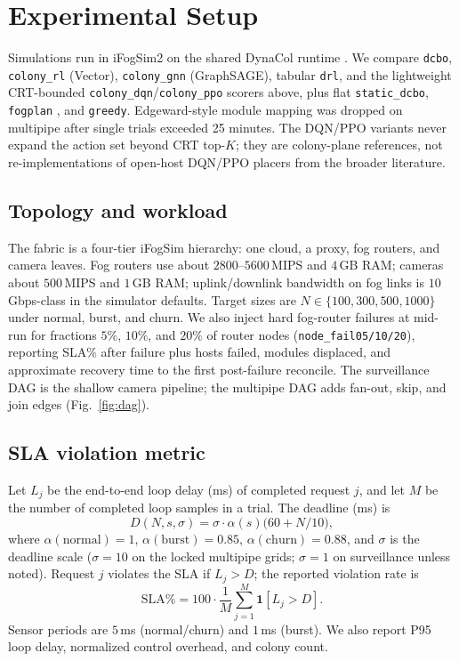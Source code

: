 \documentclass[pdflatex,sn-mathphys-num,iicol]{sn-jnl}
\begin{document}
\section{Experimental Setup}
\label{sec:setup}

Simulations run in iFogSim2 on the shared DynaCol runtime
\cite{gupta_ifogsim2017,mahmud_ifogsim2_jss2022}.
We compare \texttt{dcbo}, \texttt{colony\_rl} (Vector),
\texttt{colony\_gnn} (GraphSAGE), tabular \texttt{drl}, and the lightweight
CRT-bounded \texttt{colony\_dqn}/\texttt{colony\_ppo} scorers above, plus flat
\texttt{static\_dcbo}, \texttt{fogplan} \cite{yousefpour_fogplan_jiot2019}, and
\texttt{greedy}. Edgeward-style module mapping
\cite{taneja_im2017_edgeward} was dropped on multipipe after single trials
exceeded 25 minutes. The DQN/PPO variants never expand the action set beyond
CRT top-$K$; they are colony-plane references, not re-implementations of
open-host DQN/PPO placers from the broader literature.

\subsection{Topology and workload}
The fabric is a four-tier iFogSim hierarchy: one cloud, a proxy, fog routers, and
camera leaves. Fog routers use about $2800$--$5600$\,MIPS and $4$\,GB RAM; cameras
about $500$\,MIPS and $1$\,GB RAM; uplink/downlink bandwidth on fog links is
$10$\,Gbps-class in the simulator defaults. Target sizes are
$N\in\{100,300,500,1000\}$ under normal, burst, and churn. We also inject hard
fog-router failures at mid-run for fractions $5\%$, $10\%$, and $20\%$ of
router nodes (\texttt{node\_fail05/10/20}), reporting SLA\% after failure plus
hosts failed, modules displaced, and approximate recovery time to the first
post-failure reconcile. The surveillance DAG
is the shallow camera pipeline; the multipipe DAG adds fan-out, skip, and join
edges (Fig.~\ref{fig:dag}).

\subsection{SLA violation metric}
\label{sec:sla}
Let $L_j$ be the end-to-end loop delay (ms) of completed request $j$, and let
$M$ be the number of completed loop samples in a trial. The deadline (ms) is
\begin{equation}
D(N,s,\sigma)=\sigma\cdot\alpha(s)\bigl(60+N/10\bigr),
\label{eq:deadline}
\end{equation}
where $\alpha(\mathrm{normal}){=}1$, $\alpha(\mathrm{burst}){=}0.85$,
$\alpha(\mathrm{churn}){=}0.88$, and $\sigma$ is the deadline scale
($\sigma{=}10$ on the locked multipipe grids; $\sigma{=}1$ on surveillance unless
noted). Request $j$ violates the SLA if $L_j>D$; the reported violation rate is
\begin{equation}
\mathrm{SLA\%}=100\cdot\frac{1}{M}\sum_{j=1}^{M}\mathbf{1}[L_j>D].
\label{eq:slaviol}
\end{equation}
Sensor periods are $5$\,ms (normal/churn) and $1$\,ms (burst). We also report
P95 loop delay, normalized control overhead, and colony count.
\end{document}
